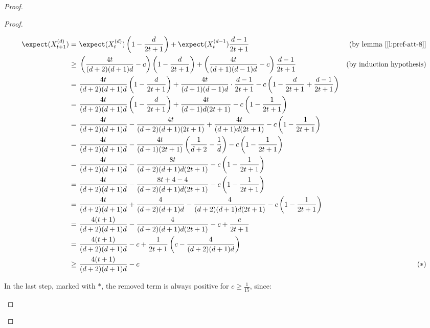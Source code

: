 \begin{proof}
\begin{proof}
\begin{itemize}
{                \scriptsize\begin{align*}
                    \expect(X_{t + 1}^{(d)}) =&\ \expect(X_t^{(d)}) \left( 1 - \frac{d}{2t + 1} \right) + \expect(X_t^{(d - 1}) \frac{d - 1}{2t + 1} & \text{(by lemma [\ref{l:pref-att-8}]} \\
                    \geq&\ \left( \frac{4t}{(d + 2)(d + 1)d} - c \right) \left( 1 - \frac{d}{2t + 1} \right) + \left( \frac{4t}{(d + 1)(d - 1)d} - c \right) \frac{d - 1}{2t +1 } & \text{(by induction hypothesis)} \\
                       =&\ \frac{4t}{(d + 2)(d + 1)d} \left( 1 - \frac{d}{2t + 1} \right) + \frac{4t}{(d + 1)(d - 1)d} \cdot \frac{d - 1}{2t + 1} - c \left( 1 - \frac{d}{2t + 1} + \frac{d - 1}{2t + 1}\right) & \\
                       =&\ \frac{4t}{(d + 2)(d + 1)d} \left( 1 - \frac{d}{2t + 1} \right) + \frac{4t}{(d + 1)d(2t + 1)} - c \left( 1 - \frac{1}{2t + 1}\right) & \\
                       =&\ \frac{4t}{(d + 2)(d + 1)d} - \frac{4t}{(d + 2)(d + 1)(2t + 1)} + \frac{4t}{(d + 1)d(2t + 1)} - c \left( 1 - \frac{1}{2t + 1}\right) & \\
                       =&\ \frac{4t}{(d + 2)(d + 1)d} - \frac{4t}{(d + 1)(2t + 1)} \left( \frac{1}{d + 2} - \frac{1}{d} \right) - c \left( 1 - \frac{1}{2t + 1}\right) & \\
                       =&\ \frac{4t}{(d + 2)(d + 1)d} - \frac{8t}{(d + 2)(d + 1)d(2t + 1)} - c \left( 1 - \frac{1}{2t + 1}\right) & \\
                       =&\ \frac{4t}{(d + 2)(d + 1)d} - \frac{8t + 4 - 4}{(d + 2)(d + 1)d(2t + 1)} - c \left( 1 - \frac{1}{2t + 1}\right) & \\
                       =&\ \frac{4t}{(d + 2)(d + 1)d} + \frac{4}{(d + 2)(d + 1)d} - \frac{4}{(d + 2)(d + 1)d(2t + 1)} - c \left( 1 - \frac{1}{2t + 1}\right) & \\
                       =&\ \frac{4(t + 1)}{(d + 2)(d + 1)d} - \frac{4}{(d + 2)(d + 1)d(2t + 1)} - c + \frac{c}{2t + 1} & \\
                       =&\ \frac{4(t + 1)}{(d + 2)(d + 1)d} - c + \frac{1}{2t + 1} \left( c - \frac{4}{(d + 2)(d + 1)d} \right) & \\
                    \geq&\ \frac{4(t + 1)}{(d + 2)(d + 1)d} - c & (*) \\
                \end{align*}


                In the last step, marked with $*$, the removed term is always positive for $c \geq \frac{1}{15}$, since:
                
}
\end{itemize}
\end{proof}
\end{proof}
